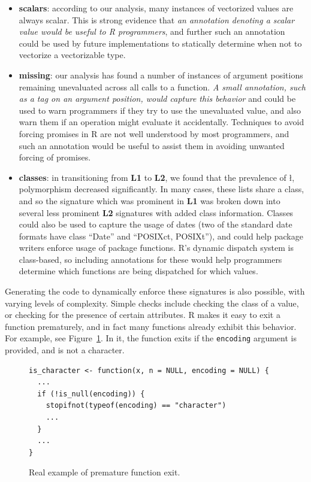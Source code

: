 \documentclass[acmsmall,10pt,review,anonymous]{acmart}\settopmatter{printfolios=true,printccs=false,printacmref=false}
\begin{document}
\begin{itemize}

	\item {\bf scalars}: according to our analysis, many instances of vectorized values are always scalar.
	This is strong evidence that {\it an annotation denoting a scalar value would be useful to R programmers}, and further such an annotation could be used by future implementations to statically determine when not to vectorize a vectorizable type.
	
	\item {\bf missing}: our analysis has found a number of instances of argument positions remaining unevaluated across all calls to a function.
	{\it A small annotation, such as a tag on an argument position, would capture this behavior} and could be used to warn programmers if they try to use the unevaluated value, and also warn them if an operation might evaluate it accidentally.
	Techniques to avoid forcing promises in R are not well understood by most programmers, and such an annotation would be useful to assist them in avoiding unwanted forcing of promises.

	\item {\bf classes}: in transitioning from {\bf L1} to {\bf L2}, we found that the prevalence of \l,  polymorphism decreased significantly.
	In many cases, these lists share a class, and so the signature which was prominent in {\bf L1} was broken down into several less prominent {\bf L2} signatures with added class information.
	Classes could also be used to capture the usage of dates (two of the standard date formats have class ``Date'' and ``POSIXct, POSIXt''), and could help package writers enforce usage of package functions.
	R's dynamic dispatch system is class-based, so including annotations for these would help programmers determine which functions are being dispatched for which values.

\end{itemize}

Generating the code to dynamically enforce these signatures is also possible, with varying levels of complexity.
Simple checks include checking the class of a value, or checking for the presence of certain attributes.
R makes it easy to exit a function prematurely, and in fact many functions already exhibit this behavior.
For example, see Figure~\ref{fig:stopifnot}.
In it, the function exits if the {\tt encoding} argument is provided, and is not a character.

\begin{figure}[!hb]{\small\begin{lstlisting}[style=R]
is_character <- function(x, n = NULL, encoding = NULL) {
  ...
  if (!is_null(encoding)) {
    stopifnot(typeof(encoding) == "character")
    ...
  }
  ...
}
\end{lstlisting}}\caption{Real example of premature function exit.}\label{fig:stopifnot}\end{figure}
\end{document}

